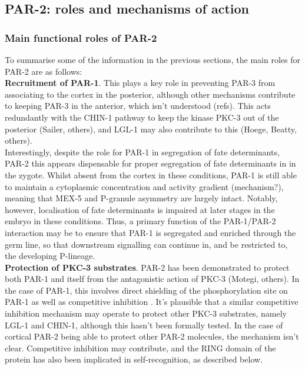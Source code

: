\documentclass[12pt]{"article"}
\begin{document}
\clearpage
\subsection{PAR-2: roles and mechanisms of action}
\subsubsection{Main functional roles of PAR-2}

To summarise some of the information in the previous sections, the main roles for PAR-2 are as follows:\\

\textbf{Recruitment of PAR-1}. This plays a key role in preventing PAR-3 from associating to the cortex in the posterior, although other mechanisms contribute to keeping PAR-3 in the anterior, which isn’t understood (refs). This acts redundantly with the CHIN-1 pathway to keep the kinase PKC-3 out of the posterior (Sailer, others), and LGL-1 may also contribute to this (Hoege, Beatty, others). \\

Interestingly, despite the role for PAR-1 in segregation of fate determinants, PAR-2 this appears dispensable for proper segregation of fate determinants in in the zygote. Whilst absent from the cortex in these conditions, PAR-1 is still able to maintain a cytoplasmic concentration and activity gradient (mechanism?), meaning that MEX-5 and P-granule asymmetry are largely intact. Notably, however, localisation of fate determinants is impaired at later stages in the embryo in these conditions. Thus, a primary function of the PAR-1/PAR-2 interaction may be to ensure that PAR-1 is segregated and enriched through the germ line, so that downstream signalling can continue in, and be restricted to, the developing P-lineage. \\

\textbf{Protection of PKC-3 substrates}. PAR-2 has been demonstrated to protect both PAR-1 and itself from the antagonistic action of PKC-3 (Motegi, others). In the case of PAR-1, this involves direct shielding of the phosphorylation site on PAR-1 as well as competitive inhibition \citep{Ramanujam2018}. It’s plausible that a similar competitive inhibition mechanism may operate to protect other PKC-3 substrates, namely LGL-1 and CHIN-1, although this hasn’t been formally tested. In the case of cortical PAR-2 being able to protect other PAR-2 molecules, the mechanism isn’t clear. Competitive inhibition may contribute, and the RING domain of the protein has also been implicated in self-recognition, as described below. \\
\end{document}

